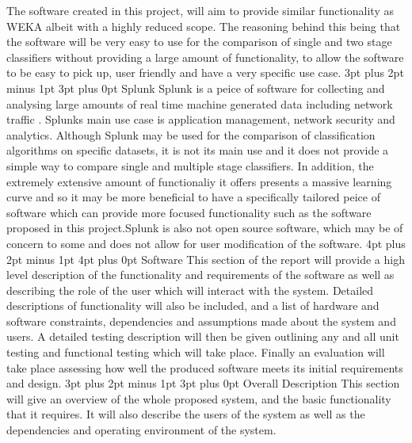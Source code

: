 \documentclass[12pt,a4paper]{article}
\makeatletter
\renewcommand\subsection{\@startsection {subsection}{1}{2mm} %
      {3pt plus 2pt minus 1pt} %
      {3pt plus 0pt} %
      {\normalfont\bfseries}}
\renewcommand\section{\@startsection {section}{1}{0mm} %
      {4pt plus 2pt minus 1pt} %
      {4pt plus 0pt} %
      {\bfseries}}
\makeatother
\begin{document}
	The software created in this project, will aim to provide similar functionality as WEKA albeit with a highly reduced scope. The reasoning behind this being that the software will be very easy to use for the comparison of single and two stage classifiers without providing a large amount of functionality, to allow the software to be easy to pick up, user friendly and have a very specific use case.
\subsection{Splunk}
Splunk is a peice of software for collecting and analysing large amounts of real time machine generated data including network traffic \parencite{splunk}. Splunks main use case is application management, network security and analytics. Although Splunk may be used for the comparison of classification algorithms on specific datasets, it is not its main use and it does not provide a simple way to compare single and multiple stage classifiers. In addition, the extremely extensive amount of functionaliy it offers presents a massive learning curve and so it may be more beneficial to have a specifically tailored peice of software which can provide more focused functionality such as the software proposed in this project.Splunk is also not open source software, which may be of concern to some and does not allow for user modification of the software.
\newpage
\section{Software}
This section of the report will provide a high level description of the functionality and requirements of the software as well as describing the role of the user which will interact with the system. Detailed descriptions of functionality will also be included, and a list of hardware and software constraints, dependencies and assumptions made about the system and users. A detailed testing description will then be given outlining any and all unit testing and functional testing which will take place. Finally an evaluation will take place assessing how well the produced software meets its initial requirements and design.
\subsection{Overall Description}
This section will give an overview of the whole proposed system, and the basic functionality that it requires. It will also describe the users of the system as well as the dependencies and operating environment of the system.
\end{document}
